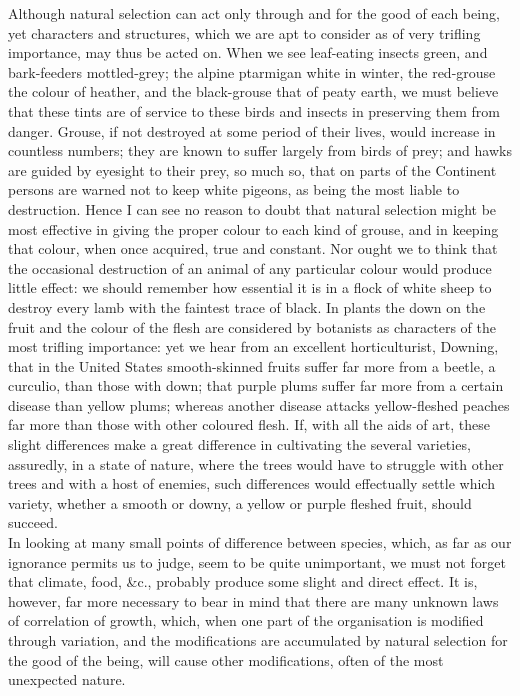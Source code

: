 \indent Although natural selection can act only through and for the good of each being, yet characters and structures, which we are apt to consider as of very trifling importance, may thus be acted on.  When we see leaf-eating insects green, and bark-feeders mottled-grey; the alpine ptarmigan white in winter, the red-grouse the colour of heather, and the black-grouse that of peaty earth, we must believe that these tints are of service to these birds and insects in preserving them from danger. Grouse, if not destroyed at some period of their lives, would increase in countless numbers; they are known to suffer largely from birds of prey; and hawks are guided by eyesight to their prey, so much so, that on parts of the Continent persons are warned not to keep white pigeons, as being the most liable to destruction.  Hence I can see no reason to doubt that natural selection might be most effective in giving the proper colour to each kind of grouse, and in keeping that colour, when once acquired, true and constant. Nor ought we to think that the occasional destruction of an animal of any particular colour would produce little effect: we should remember how essential it is in a flock of white sheep to destroy every lamb with the faintest trace of black. In plants the down on the fruit and the colour of the flesh are considered by botanists as characters of the most trifling importance: yet we hear from an excellent horticulturist, Downing, that in the United States smooth-skinned fruits suffer far more from a beetle, a curculio, than those with down; that purple plums suffer far more from a certain disease than yellow plums; whereas another disease attacks yellow-fleshed peaches far more than those with other coloured flesh. If, with all the aids of art, these slight differences make a great difference in cultivating the several varieties, assuredly, in a state of nature, where the trees would have to struggle with other trees and with a host of enemies, such differences would effectually settle which variety, whether a smooth or downy, a yellow or purple fleshed fruit, should succeed. \\
\indent In looking at many small points of difference between species, which, as far as our ignorance permits us to judge, seem to be quite unimportant, we must not forget that climate, food, \&c., probably produce some slight and direct effect. It is, however, far more necessary to bear in mind that there are many unknown laws of correlation of growth, which, when one part of the organisation is modified through variation, and the modifications are accumulated by natural selection for the good of the being, will cause other modifications, often of the most unexpected nature. \\
